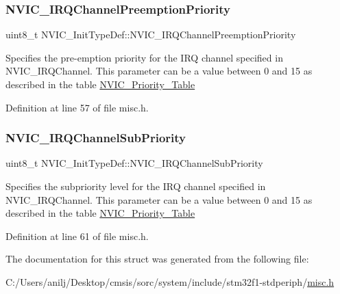 \subsubsection{\texorpdfstring{N\+V\+I\+C\+\_\+\+I\+R\+Q\+Channel\+Preemption\+Priority}{NVIC\_IRQChannelPreemptionPriority}}
{\footnotesize\ttfamily uint8\+\_\+t N\+V\+I\+C\+\_\+\+Init\+Type\+Def\+::\+N\+V\+I\+C\+\_\+\+I\+R\+Q\+Channel\+Preemption\+Priority}

Specifies the pre-\/emption priority for the I\+RQ channel specified in N\+V\+I\+C\+\_\+\+I\+R\+Q\+Channel. This parameter can be a value between 0 and 15 as described in the table \hyperlink{group___n_v_i_c___priority___table}{N\+V\+I\+C\+\_\+\+Priority\+\_\+\+Table} 

Definition at line 57 of file misc.\+h.

\mbox{\label{struct_n_v_i_c___init_type_def_aecc22a002244e3f1f9448dbe46c1db4b}} 
\subsubsection{\texorpdfstring{N\+V\+I\+C\+\_\+\+I\+R\+Q\+Channel\+Sub\+Priority}{NVIC\_IRQChannelSubPriority}}
{\footnotesize\ttfamily uint8\+\_\+t N\+V\+I\+C\+\_\+\+Init\+Type\+Def\+::\+N\+V\+I\+C\+\_\+\+I\+R\+Q\+Channel\+Sub\+Priority}

Specifies the subpriority level for the I\+RQ channel specified in N\+V\+I\+C\+\_\+\+I\+R\+Q\+Channel. This parameter can be a value between 0 and 15 as described in the table \hyperlink{group___n_v_i_c___priority___table}{N\+V\+I\+C\+\_\+\+Priority\+\_\+\+Table} 

Definition at line 61 of file misc.\+h.



The documentation for this struct was generated from the following file\+:\begin{DoxyCompactItemize}
\item 
C\+:/\+Users/anilj/\+Desktop/cmsis/sorc/system/include/stm32f1-\/stdperiph/\hyperlink{misc_8h}{misc.\+h}\end{DoxyCompactItemize}

